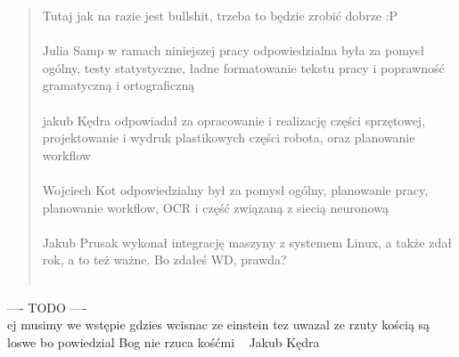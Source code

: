 \begin{quote}
    Tutaj jak na razie jest bullshit, trzeba to będzie zrobić dobrze :P \\ \\
    Julia Samp w ramach niniejszej pracy odpowiedzialna była za pomysł ogólny, testy statystyczne, ładne formatowanie tekstu pracy i poprawność gramatyczną i ortograficzną \\ \\
    jakub Kędra odpowiadał za opracowanie i realizację części sprzętowej, projektowanie i wydruk plastikowych części robota, oraz planowanie workflow \\ \\
    Wojciech Kot odpowiedzialny był za pomysł ogólny, planowanie pracy, planowanie workflow, OCR i część związaną z siecią neuronową \\ \\
    Jakub Prusak wykonał integrację maszyny z systemem Linux, a także zdał rok, a to też ważne. Bo zdałeś WD, prawda? \\ \\
\end{quote}


---- TODO ---- \\
ej musimy we wstępie gdzies wcisnac ze einstein tez uwazal ze rzuty kością są loswe bo powiedzial Bog nie rzuca kośćmi ~ Jakub Kędra


